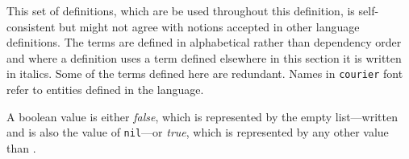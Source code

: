 \begin{optPrivate}
\end{optPrivate}
\begin{optDefinition}
\label{sec:definitions}
This set of definitions, which are be used throughout this definition,
is self-consistent but might not agree with notions accepted in other
language definitions.  The terms are defined in alphabetical rather
than dependency order and where a definition uses a term defined
elsewhere in this section it is written in italics.  Some of the terms
defined here are redundant.  Names in {\tt courier} font refer to
entities defined in the language.
%
\begin{definitions}
     A boolean value is either {\em
        false}, which is represented by the empty
    list---written \nil\/ and is also the value of {\tt nil}---or {\em
        true}, which is represented by any other value than
    \nil.

\end{definitions}
\end{optDefinition}
